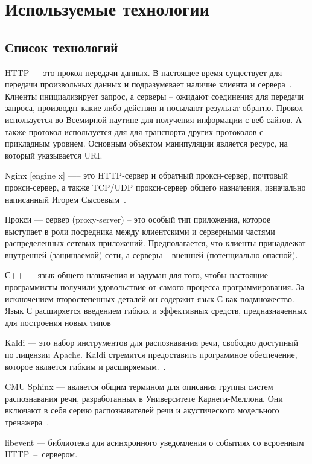 
\chapter{Используемые технологии}
\section{Список технологий}

\hyperlink{http}{HTTP} --- это прокол передачи данных. В настоящее время существует для передачи
произвольных данных и подразумевает наличие клиента и сервера~\cite{http}.
Клиенты инициализирует запрос, а серверы – ожидают соединения для передачи
запроса, производят какие-либо действия и посылают результат обратно. Прокол
используется во Всемирной паутине для получения информации с веб-сайтов. А
также протокол используется для для транспорта других протоколов с прикладным
уровнем. Основным объектом манипуляции является ресурс, на который указывается URI.

Nginx [engine x] —-- это HTTP-сервер и обратный прокси-сервер, почтовый
прокси-сервер, а также TCP/UDP прокси-сервер общего назначения, изначально
написанный Игорем Сысоевым~\cite{nginx}.

Прокси --- сервер (proxy-server) – это особый тип приложения, которое
выступает в роли посредника между клиентскими и серверными частями
распределенных сетевых приложений. Предполагается, что клиенты принадлежат
внутренней (защищаемой) сети, а серверы – внешней (потенциально опасной).

С++ --- язык общего назначения и задуман для того, чтобы настоящие программисты получили
удовольствие от самого процесса программирования. За исключением второстепенных деталей он
содержит язык С как подмножество. Язык С расширяется введением гибких и эффективных средств,
предназначенных для построения новых типов~\cite{cpp}

Kaldi --- это набор инструментов для распознавания речи, свободно доступный по
лицензии Apache. Kaldi стремится предоставить программное обеспечение, которое
является гибким и расширяемым.~\cite{kaldi}.

CMU Sphinx --- является общим термином для описания группы систем распознавания
речи, разработанных в Университете Карнеги-Меллона. Они включают в себя серию
распознавателей речи и акустического модельного тренажера~\cite{sphinx}.

libevent --- библиотека для асинхронного уведомления о событиях со всроенным
HTTP~--~сервером.

